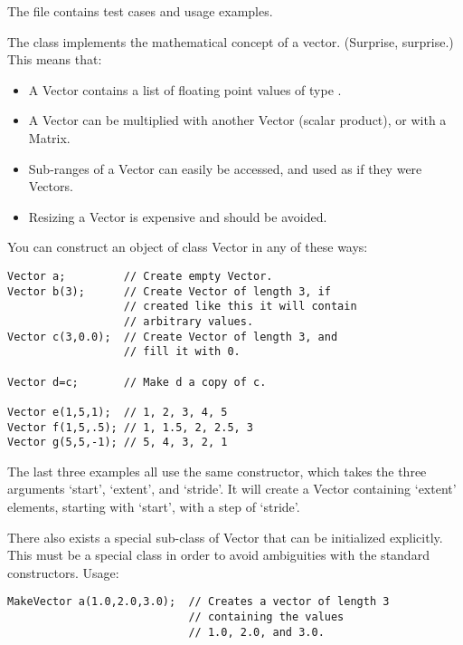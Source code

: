 The file  contains test cases and usage
examples. 

\label{sec:matpack:vectors}

The class  implements the mathematical concept of a
vector. (Surprise, surprise.) This means that:
\begin{itemize}
\item A Vector contains a list of floating point values of type .
\item A Vector can be multiplied with another Vector (scalar product),
  or with a Matrix.
\item Sub-ranges of a Vector can easily be accessed, and used as if
  they were Vectors.
\item Resizing a Vector is expensive and should be avoided.
\end{itemize}

You can construct an object of class Vector in any of these ways:

\begin{verbatim}
Vector a;         // Create empty Vector.
Vector b(3);      // Create Vector of length 3, if
                  // created like this it will contain
                  // arbitrary values.
Vector c(3,0.0);  // Create Vector of length 3, and
                  // fill it with 0.

Vector d=c;       // Make d a copy of c.

Vector e(1,5,1);  // 1, 2, 3, 4, 5
Vector f(1,5,.5); // 1, 1.5, 2, 2.5, 3
Vector g(5,5,-1); // 5, 4, 3, 2, 1
\end{verbatim}

The last three examples all use the same constructor, which takes
the three arguments `start', `extent', and `stride'. It will create a
Vector containing `extent' elements, starting with `start', with a
step of `stride'.

There also exists a special sub-class of Vector that can be initialized
explicitly. This must be a special class in order to avoid ambiguities
with the standard constructors. Usage:

\begin{verbatim}
MakeVector a(1.0,2.0,3.0);  // Creates a vector of length 3 
                            // containing the values 
                            // 1.0, 2.0, and 3.0.
\end{verbatim}


